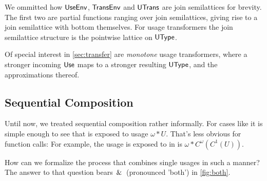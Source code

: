 
We ommitted how $\text{\textsf{UseEnv}}$, $\text{\textsf{TransEnv}}$ and $\text{\textsf{UTrans}}$ are join semilattices for brevity. The first two are partial functions ranging over join semilattices, giving rise to a join semilattice with bottom themselves. For usage transformers the join semilattice structure is the pointwise lattice on $\text{\textsf{UType}}$. 

Of special interest in \cref{sec:transfer} are \emph{monotone} usage transformers, \eg where a stronger incoming $\text{\textsf{Use}}$ maps to a stronger resulting $\text{\textsf{UType}}$, and the approximations thereof.

\subsection{Sequential Composition}\label{sec:both}

Until now, we treated sequential composition rather informally. 
For cases like  it is simple enough to see that  is exposed to usage $\omega*U$. 
That's less obvious for function calls: For example, the usage  is exposed to in  is $\omega*C^\omega(C^1(U))$.

How can we formalize the process that combines single usages in such a manner?
The answer to that question bears $\,\&\,$ (pronounced 'both') in \cref{fig:both}.

